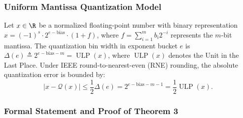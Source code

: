 \subsubsection{Uniform Mantissa Quantization Model}
Let $x \in \R$ be a normalized floating-point number with binary representation $x = (-1)^s \cdot 2^{e - \text{bias}} \cdot (1 + f)$, where $f = \sum_{i=1}^m b_i 2^{-i}$ represents the $m$-bit mantissa. The quantization bin width in exponent bucket $e$ is $\Delta(e) \triangleq 2^{e - \text{bias} - m} = \operatorname{ULP}(x)$, where $\operatorname{ULP}(x)$ denotes the Unit in the Last Place. Under IEEE round-to-nearest-even (RNE) rounding, the absolute quantization error is bounded by:
\begin{equation}
| x - \mathcal{Q}(x) | \le \frac{1}{2} \Delta(e) = 2^{e - \text{bias} - m - 1} = \frac{1}{2} \operatorname{ULP}(x).
\label{eq:fp8_pointwise_ulp}
\end{equation}

\subsubsection{Formal Statement and Proof of Theorem 3}

